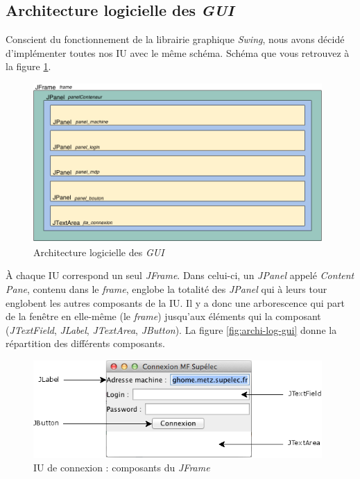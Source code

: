 \subsection{Architecture logicielle des \emph{GUI}}
\label{sec:archi-log-gui}

\par Conscient du fonctionnement de la librairie graphique \emph{Swing}, nous avons décidé d'implémenter toutes nos IU avec le même schéma. Schéma que vous retrouvez à la figure \ref{fig:archi-log-gui}.

\begin{figure}[h!]
  \centering
  \includegraphics[width=11cm]{images/archi_log_iu.png}
  \caption{Architecture logicielle des \emph{GUI}}
  \label{fig:archi-log-gui}
\end{figure}

\par À chaque IU correspond un seul \emph{JFrame}. Dans celui-ci, un \emph{JPanel} appelé \emph{Content Pane}, contenu dans le \emph{frame}, englobe la totalité des \emph{JPanel} qui à leurs tour englobent les autres composants de la IU. Il y a donc une arborescence qui part de la fenêtre en elle-même (le \emph{frame}) jusqu’aux éléments qui la composant (\emph{JTextField}, \emph{JLabel}, \emph{JTextArea}, \emph{JButton}). La figure \vref{fig:archi-log-gui} donne la répartition des différents composants.

\begin{figure}[h!]
  \centering
  \includegraphics[width=11cm]{images/iuconnexion_launch_archi.png}
  \caption{IU de connexion : composants du \emph{JFrame}}
  \label{fig:archi-log-gui2}
\end{figure}

